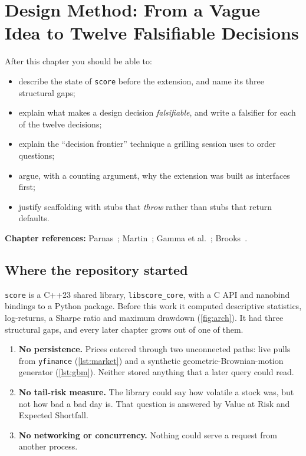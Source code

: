 \chapter{Design Method: From a Vague Idea to Twelve Falsifiable Decisions}\label{ch:design}

\begin{objectives}
After this chapter you should be able to:
\begin{itemize}
\item describe the state of \texttt{score} before the extension, and name its three structural gaps;
\item explain what makes a design decision \emph{falsifiable}, and write a falsifier for each of the twelve decisions;
\item explain the ``decision frontier'' technique a grilling session uses to order questions;
\item argue, with a counting argument, why the extension was built as interfaces first;
\item justify scaffolding with stubs that \emph{throw} rather than stubs that return defaults.
\end{itemize}
{\small\color{muted}\textbf{Chapter references:} Parnas~\cite{parnas1972criteria}; Martin~\cite{martin2003agile}; Gamma et al.~\cite{gamma1994design};
Brooks~\cite{brooks1975mythical}.}
\end{objectives}

\section{Where the repository started}\label{sec:start}
\texttt{score} is a C++23 shared library, \texttt{libscore\_core}, with a C API and nanobind bindings to a Python
package. Before this work it computed descriptive statistics, log-returns, a Sharpe ratio and maximum drawdown
(\cref{fig:arch}). It had three structural gaps, and every later chapter grows out of one of them.

\begin{enumerate}[label=\textbf{\color{yel}G\arabic*.}]
\item \textbf{No persistence.} Prices entered through two unconnected paths: live pulls from \texttt{yfinance}
(\cref{lst:market}) and a synthetic geometric-Brownian-motion generator (\cref{lst:gbm}). Neither stored anything that a
later query could read.
\item \textbf{No tail-risk measure.} The library could say how volatile a stock was, but not how bad a bad day is.
That question is answered by Value at Risk and Expected Shortfall.
\item \textbf{No networking or concurrency.} Nothing could serve a request from another process.
\end{enumerate}

